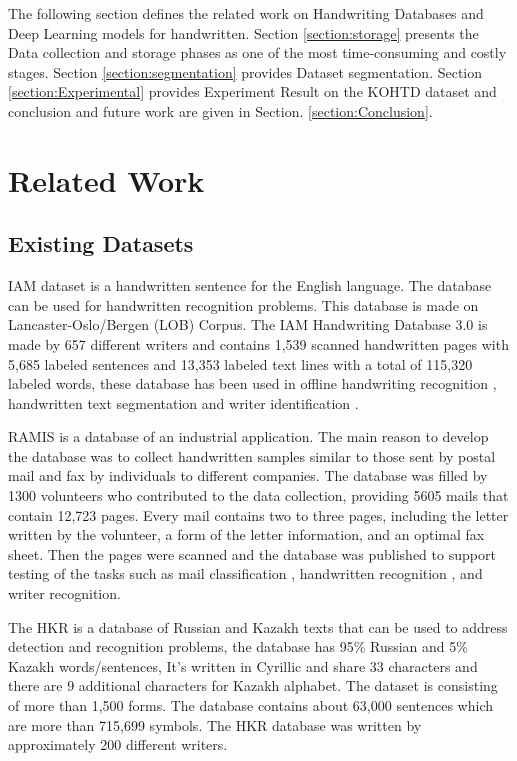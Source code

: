 \documentclass[preprint,12pt]{elsarticle}
\begin{document}
The following section defines the related work on Handwriting Databases and Deep Learning models for handwritten. Section \ref{section:storage} presents the Data collection and storage phases as one of the most time-consuming and costly stages. Section \ref{section:segmentation} provides Dataset segmentation. Section \ref{section:Experimental} provides Experiment Result on the KOHTD dataset and conclusion and future work are given in Section. \ref{section:Conclusion}.

\section{Related Work}
\subsection{Existing Datasets}
IAM dataset \cite{marti1999full,marti2002iam} is a handwritten sentence for the English language. The database can be used for handwritten recognition problems. This database is made on Lancaster-Oslo/Bergen (LOB) Corpus. The IAM Handwriting Database 3.0 is made by 657 different writers and contains 1,539 scanned handwritten pages with 5,685 labeled sentences and 13,353 labeled text lines with a total of 115,320 labeled words, these database has been used in offline handwriting recognition \cite{bunke2004offline,dreuw2011hierarchical,gatos2006hybrid}, handwritten text segmentation \cite{salvi2013handwritten,dos2009text} and writer identification \cite{bensefia2005writer,daniels2013discriminating}.

RAMIS \cite{augustin2006rimes} is a database of an industrial application. The main reason to develop the database was to collect handwritten samples similar to those sent by postal mail and fax by individuals to different companies. The database was filled by 1300 volunteers who contributed to the data collection, providing 5605 mails that contain 12,723 pages. Every mail contains two to three pages, including the letter written by the volunteer, a form of the letter information, and an optimal fax sheet. Then the pages were scanned and the database was published to support testing of the tasks such as mail classification \cite{kermorvant2010handwritten}, handwritten recognition \cite{guichard2010handwritten}, and writer recognition\cite{siddiqi2010text}.

The HKR \cite{nurseitov2021handwritten} is a database of Russian and Kazakh texts that can be used to address detection and recognition problems, the database has 95\% Russian and 5\% Kazakh words/sentences, It’s written in Cyrillic and share 33 characters and there are 9 additional characters for Kazakh alphabet. The dataset is consisting of more than 1,500 forms. The database contains about 63,000 sentences which are more than 715,699 symbols. The HKR database was written by approximately 200 different writers.
\end{document}
